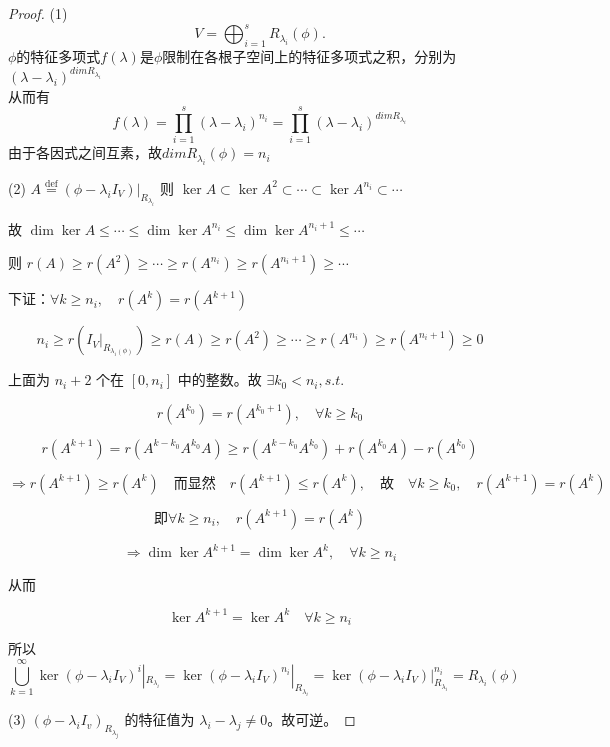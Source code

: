 \documentclass[lang=cn,12pt]{elegantbook}
\begin{document}
\begin{proof}
    (1)
    \[
    V = \bigoplus_{i=1}^s R_{\lambda_i}(\phi).
    \]
    $\phi$的特征多项式$f(\lambda)$是$\phi$限制在各根子空间上的特征多项式之积，分别为$(\lambda - \lambda_i)^{dim R_{\lambda_i}}$ \\
    从而有$$f(\lambda) = \prod_{i = 1}^s(\lambda - \lambda_i)^{n_i} = \prod_{i = 1}^s(\lambda - \lambda_i)^{dim R_{\lambda_i}} $$
    由于各因式之间互素，故$dimR_{\lambda_i}(\phi) = n_i$

    (2)  \( A \overset{\text{def}}{=} (\phi-\lambda_i I_V )|_{R_{\lambda_i}} \) 则 \( \ker A \subset \ker A^2 \subset \cdots \subset \ker A^{n_i} \subset \cdots \)

    故 \( \dim \ker A \leq \cdots \leq \dim \ker A^{n_i} \leq \dim \ker A^{n_i+1} \leq \cdots \)
    
    则 \( r(A) \geq r(A^2) \geq \cdots \geq r(A^{n_i}) \geq r(A^{n_i+1}) \geq \cdots \)
    
    下证：\( \forall k \geq n_i, \quad r(A^k) = r(A^{k+1}) \)
    
    \[n_i \geq r(I_V|_{R_{\lambda_i(\phi)}}) \geq r(A) \geq r(A^{2}) \geq \cdots \geq r(A^{n_i}) \geq r(A^{n_{i}+1}) \geq 0\]
    
    上面为 \( n_i+2 \) 个在 \( [0,n_i]\) 中的整数。故 \( \exists k_0 < n_i, s.t. \)
    
    \[r(A^{k_0}) = r(A^{k_0+1}), \quad \forall k \geq k_0\]
    
    \[r(A^{k+1}) = r(A^{k - k_0}A^{k_0}A) \geq r(A^{k-k_0}A^{k_0}) + r(A^{k_0}A) - r(A^{k_0})\]
    
    \[\Rightarrow r(A^{k+1}) \geq r(A^{k}) \quad \text{而显然} \quad r(A^{k+1}) \leq r(A^{k}), \quad \text{故} \quad \forall k \geq k_0, \quad r(A^{k+1}) = r(A^{k}) \]  

    \[
        \text{即}  \forall k \geq n_i, \quad r(A^{k+1}) = r(A^{k})
    \]
    
    \[\Rightarrow \dim \ker A^{k+1} = \dim \ker A^{k}, \quad \forall k \geq n_i\]
    
    从而

    \[
    \ker A^{k+1} = \ker A^{k} \quad \forall k \geq n_i
    \]

    所以
    \[\bigcup_{k=1}^{\infty} \ker(\phi-\lambda_i I_V)^{i}|_{R_{\lambda_i}} = \ker(\phi-\lambda_i I_V)^{n_i}|_{R_{\lambda_i}} = \ker(\phi-\lambda_i I_V)|_{R_{\lambda_i}}^{n_i}  = R_{\lambda_i}(\phi)\]

    (3)  \((\phi-\lambda_i I_v)_{R_{\lambda_j}}\) 的特征值为 \(\lambda_i - \lambda_j \neq 0\)。故可逆。


\end{proof}
\end{document}
